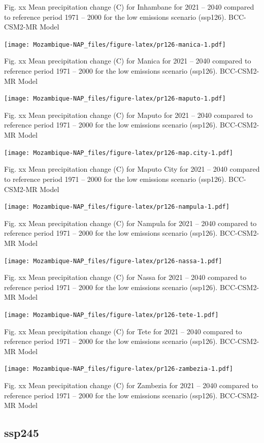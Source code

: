 \documentclass[
]{book}
\begin{document}
Fig. xx Mean precipitation change (C) for Inhambane for 2021 -- 2040 compared to reference period 1971 -- 2000 for the low emissions scenario (ssp126). BCC-CSM2-MR Model

\texttt{[image: Mozambique-NAP\_files/figure-latex/pr126-manica-1.pdf]}

Fig. xx Mean precipitation change (C) for Manica for 2021 -- 2040 compared to reference period 1971 -- 2000 for the low emissions scenario (ssp126). BCC-CSM2-MR Model

\texttt{[image: Mozambique-NAP\_files/figure-latex/pr126-maputo-1.pdf]}

Fig. xx Mean precipitation change (C) for Maputo for 2021 -- 2040 compared to reference period 1971 -- 2000 for the low emissions scenario (ssp126). BCC-CSM2-MR Model

\texttt{[image: Mozambique-NAP\_files/figure-latex/pr126-map.city-1.pdf]}

Fig. xx Mean precipitation change (C) for Maputo City for 2021 -- 2040 compared to reference period 1971 -- 2000 for the low emissions scenario (ssp126). BCC-CSM2-MR Model

\texttt{[image: Mozambique-NAP\_files/figure-latex/pr126-nampula-1.pdf]}

Fig. xx Mean precipitation change (C) for Nampula for 2021 -- 2040 compared to reference period 1971 -- 2000 for the low emissions scenario (ssp126). BCC-CSM2-MR Model

\texttt{[image: Mozambique-NAP\_files/figure-latex/pr126-nassa-1.pdf]}

Fig. xx Mean precipitation change (C) for Nassa for 2021 -- 2040 compared to reference period 1971 -- 2000 for the low emissions scenario (ssp126). BCC-CSM2-MR Model

\texttt{[image: Mozambique-NAP\_files/figure-latex/pr126-tete-1.pdf]}

Fig. xx Mean precipitation change (C) for Tete for 2021 -- 2040 compared to reference period 1971 -- 2000 for the low emissions scenario (ssp126). BCC-CSM2-MR Model

\texttt{[image: Mozambique-NAP\_files/figure-latex/pr126-zambezia-1.pdf]}

Fig. xx Mean precipitation change (C) for Zambezia for 2021 -- 2040 compared to reference period 1971 -- 2000 for the low emissions scenario (ssp126). BCC-CSM2-MR Model

\hypertarget{ssp245-1}{%
\subsection{ssp245}\label{ssp245-1}}
\end{document}
